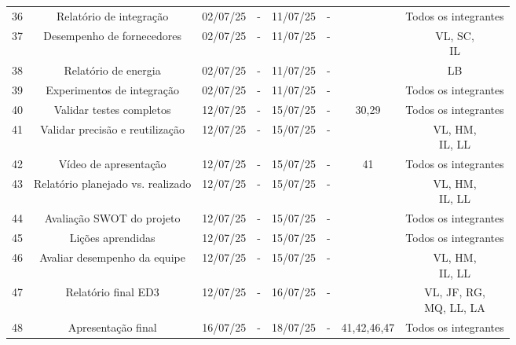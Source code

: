 \begin{table}[htpb]
\begin{tabular}{|c|c|c|c|c|c|c|c|}
36 & Relatório de integração & 02/07/25 & - & 11/07/25 & - &  & Todos os integrantes \\
37 & Desempenho de fornecedores & 02/07/25 & - & 11/07/25 & - &  & \makecell{VL, SC, \\ IL} \\
38 & Relatório de energia & 02/07/25 & - & 11/07/25 & - &  & LB \\
39 & Experimentos de integração & 02/07/25 & - & 11/07/25 & - &  & Todos os integrantes \\
40 & Validar testes completos & 12/07/25 & - & 15/07/25 & - & 30,29 & Todos os integrantes \\
41 & Validar precisão e reutilização & 12/07/25 & - & 15/07/25 & - &  & \makecell{VL, HM, \\ IL, LL} \\
42 & Vídeo de apresentação & 12/07/25 & - & 15/07/25 & - & 41 & Todos os integrantes \\
43 & Relatório planejado vs. realizado & 12/07/25 & - & 15/07/25 & - &  & \makecell{VL, HM, \\ IL, LL} \\
44 & Avaliação SWOT do projeto & 12/07/25 & - & 15/07/25 & - &  & Todos os integrantes \\
45 & Lições aprendidas & 12/07/25 & - & 15/07/25 & - &  & Todos os integrantes \\
46 & Avaliar desempenho da equipe & 12/07/25 & - & 15/07/25 & - &  & \makecell{VL, HM, \\ IL, LL} \\
47 & Relatório final ED3 & 12/07/25 & - & 16/07/25 & - &  & \makecell{VL, JF, RG, \\ MQ, LL, LA} \\
48 & Apresentação final & 16/07/25 & - & 18/07/25 & - & 41,42,46,47 & Todos os integrantes \\
\hline
\end{tabular}
\label{tab:cronograma2}
\end{table}






